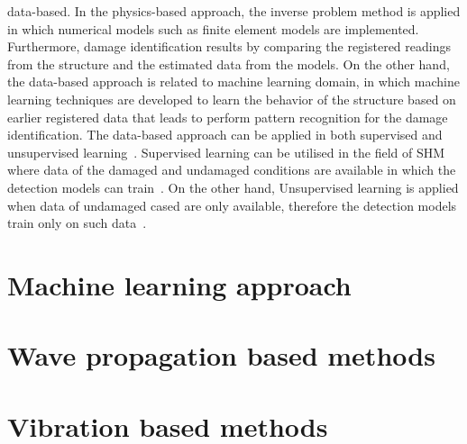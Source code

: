 \documentclass[b5paper, 11pt, openany, titlepage]{book}
\begin{document}
data-based.
In the physics-based approach, the inverse problem method is applied in which numerical models such as finite element models are implemented. 
Furthermore, damage identification results by comparing the registered readings from the structure and the estimated data from the models.
On the other hand,  the data-based approach is related to machine learning domain, in which machine learning techniques are developed to learn the behavior of the structure based on earlier registered data that leads to perform pattern recognition for the damage identification.
The data-based approach can be applied in both supervised and unsupervised learning~\cite{worden2007application}.
Supervised learning can be utilised in the field of SHM where data of the damaged and undamaged conditions are available in which the detection models can train~\cite{figueiredo2018machine}.
On the other hand, Unsupervised learning is applied when data of undamaged cased are only available, therefore the detection models train only on such data~\cite{figueiredo2018machine}. 

\section{Machine learning approach}
\subsection{}
\subsection{}
\section{Wave propagation based methods}
\subsection{}
\subsection{}
\section{Vibration based methods}
\end{document}
